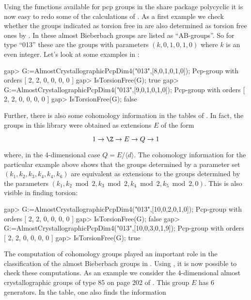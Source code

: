

Using the functions available for pcp groups in the share package 
{\sf polycyclic} it is now easy to redo some of the calculations of 
\cite{KD}. As a first example we check whether the groups indicated 
as torsion free in \cite{KD} are also determined as torsion free
ones by \GAP. In \cite{KD} these almost Bieberbach groups are listed as 
``AB-groups''. So for type ``013'' these are the groups with parameters 
$(k,0,1,0,1,0)$ where $k$ is an even integer. Let's look at some examples 
in \GAP:

\beginexample
gap> G:=AlmostCrystallographicPcpDim4("013",[8,0,1,0,1,0]);
Pcp-group with orders [ 2, 2, 0, 0, 0, 0 ]
gap> IsTorsionFree(G);
true
gap> G:=AlmostCrystallographicPcpDim4("013",[9,0,1,0,1,0]);
Pcp-group with orders [ 2, 2, 0, 0, 0, 0 ]
gap> IsTorsionFree(G);
false
\endexample

Further, there is also some cohomology information in the tables 
of \cite{KD}. In fact, the groups in this library were obtained
as extensions $E$ of the form

$$
1 \rightarrow \Z \rightarrow E \rightarrow Q \rightarrow 1
$$

where, in the 4-dimensional case $Q = E/\langle d \rangle$. The 
cohomology information for the particular example above shows that 
the groups determined by a parameter set $(k_1,k_2,k_3,k_4,k_4,k_6)$ 
are equivalent as extensions to the groups determined by the parameters 
$(k_1, k_2 \bmod 2, k_3 \bmod 2, k_4 \bmod 2, k_5 \bmod 2, 0)$. This is 
also visible in finding torsion:

\beginexample
gap> G:=AlmostCrystallographicPcpDim4("013",[10,0,2,0,1,0]);
Pcp-group with orders [ 2, 2, 0, 0, 0, 0 ]
gap> IsTorsionFree(G);
false
gap> G:=AlmostCrystallographicPcpDim4("013",[10,0,3,0,1,9]);
Pcp-group with orders [ 2, 2, 0, 0, 0, 0 ]
gap> IsTorsionFree(G);
true
\endexample


The computation of cohomology groups played an important role in the 
classification of the almost Bieberbach groups in \cite{KD}. Using 
\GAP, it is now possible to check these computations. As an example we 
consider the 4-dimensional almost crystallographic groups of type 85 on 
page 202 of \cite{KD}. This group $E$ has 6 generators. In the table, one 
also finds the information


